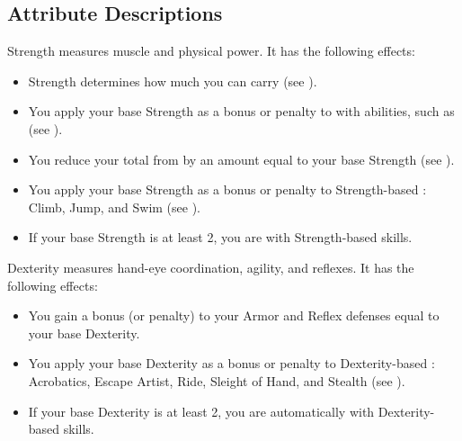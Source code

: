     \subsection{Attribute Descriptions}

        \label{Strength}
        {
            Strength measures muscle and physical power.
            It has the following effects:
            \begin{itemize}
                \item Strength determines how much you can carry (see ).
                \item You apply your base Strength as a bonus or penalty to  with  abilities, such as  (see ).
                \item You reduce your total  from  by an amount equal to your base Strength (see ).
                \item You apply your base Strength as a bonus or penalty to Strength-based : Climb, Jump, and Swim (see ).
                \item If your base Strength is at least 2, you are  with Strength-based skills.
            \end{itemize}
        }

        \label{Dexterity}
        {
            Dexterity measures hand-eye coordination, agility, and reflexes.
            It has the following effects:
            \begin{itemize}
                \item You gain a bonus (or penalty) to your Armor and Reflex defenses equal to your base Dexterity.
                \item You apply your base Dexterity as a bonus or penalty to Dexterity-based : Acrobatics, Escape Artist, Ride, Sleight of Hand, and Stealth (see ).
                \item If your base Dexterity is at least 2, you are automatically  with Dexterity-based skills.
            \end{itemize}
        }

